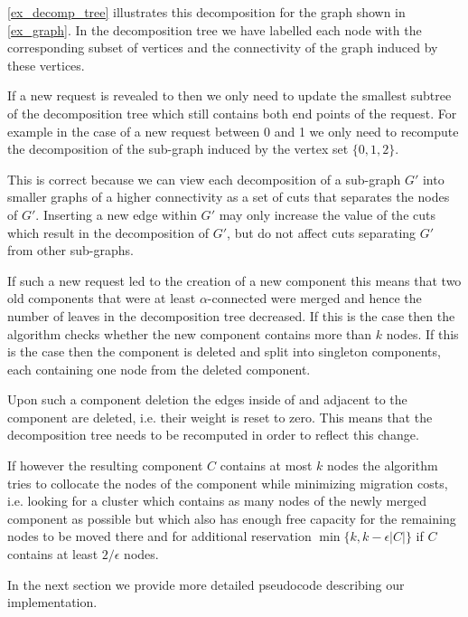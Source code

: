 \documentclass[a4paper,xcolor=dvipsnames, tikz, 12pt]{article}
\newcommand{\crep}{\text{C{\scriptsize REP}}}
\theoremstyle{definition}
\begin{document}
\cref{ex_decomp_tree} illustrates this decomposition for the graph shown in \cref{ex_graph}. In the decomposition tree we have labelled each node with the corresponding subset of vertices and the connectivity of the graph induced by these vertices.

If a new request is revealed to \crep{} then we only need to update the smallest subtree of the decomposition tree which still contains both end points of the request. For example in the case of a new request between 0 and 1 we only need to recompute the decomposition of the sub-graph induced by the vertex set $\{0,1,2\}$. 

This is correct because we can view each decomposition of a sub-graph $G'$ into smaller graphs of a higher connectivity as a set of cuts that separates the nodes of $G'$. Inserting a new edge within $G'$ may only increase the value of the cuts which result in the decomposition of $G'$, but do not affect cuts separating $G'$ from other sub-graphs.

If such a new request led to the creation of a new component this means that two old components that were at least $\alpha$-connected were merged and hence the number of leaves in the decomposition tree decreased. If this is the case then the algorithm checks whether the new component contains more than $k$ nodes. If this is the case then the component is deleted and split into singleton components, each containing one node from the deleted component.

Upon such a component deletion the edges inside of and adjacent to the component are deleted, i.e. their weight is reset to zero. This means that the decomposition tree needs to be recomputed in order to reflect this change.

If however the resulting component $C$ contains at most $k$ nodes the algorithm tries to collocate the nodes of the component while minimizing migration costs, i.e. looking for a cluster which contains as many nodes of the newly merged component as possible but which also has enough free capacity for the remaining nodes to be moved there and for additional reservation $\min\{k, k-\epsilon|C|\}$ if $C$ contains at least $2/\epsilon$ nodes. %

In the next section we provide more detailed pseudocode describing our implementation.
\end{document}
